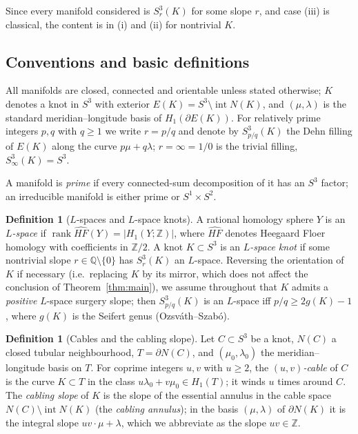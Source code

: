 \documentclass[11pt]{article}
\theoremstyle{definition}
\newtheorem{definition}[theorem]{Definition}
\theoremstyle{remark}
\DeclareMathOperator{\rank}{rank}
\newcommand{\HF}{\widehat{HF}}
\newcommand{\Z}{\mathbb{Z}}
\begin{document}
Since every manifold considered is $S^3_r(K)$ for some slope $r$, and case
(iii) is classical, the content is in (i) and (ii) for nontrivial $K$.

\subsection{Conventions and basic definitions}

All manifolds are closed, connected and orientable unless stated otherwise;
$K$ denotes a knot in $S^3$ with exterior $E(K)=S^{3}\setminus \operatorname{int}N(K)$,
and $(\mu,\lambda)$ is the standard meridian--longitude basis of
$H_1(\partial E(K))$.  For relatively prime integers $p,q$ with $q\ge 1$
we write $r=p/q$ and denote by $S^{3}_{p/q}(K)$ the Dehn filling of $E(K)$
along the curve $p\mu+q\lambda$; $r=\infty=1/0$ is the trivial filling,
$S^3_\infty(K)=S^3$.

A manifold is \emph{prime} if every connected-sum decomposition of it has an
$S^3$ factor; an irreducible manifold is either prime or $S^1\times S^2$.

\begin{definition}[$L$-spaces and $L$-space knots]
A rational homology sphere $Y$ is an \emph{$L$-space} if
$\rank \HF(Y)=|H_1(Y;\Z)|$, where $\HF$ denotes Heegaard Floer homology with
coefficients in $\Z/2$.  A knot $K\subset S^3$ is an \emph{$L$-space knot} if
some nontrivial slope $r\in\mathbb{Q}\setminus\{0\}$ has $S^3_r(K)$ an
$L$-space.  Reversing the orientation of $K$ if necessary (i.e.\ replacing $K$
by its mirror, which does not affect the conclusion of
Theorem~\ref{thm:main}), we assume throughout that $K$ admits a
\emph{positive} $L$-space surgery slope; then $S^3_{p/q}(K)$ is an $L$-space
iff $p/q\ge 2g(K)-1$, where $g(K)$ is the Seifert genus
(Ozsv\'ath--Szab\'o).
\end{definition}

\begin{definition}[Cables and the cabling slope]\label{def:cable}
Let $C\subset S^3$ be a knot, $N(C)$ a closed tubular neighbourhood,
$T=\partial N(C)$, and $(\mu_0,\lambda_0)$ the meridian--longitude basis on
$T$.  For coprime integers $u,v$ with $u\ge 2$, the \emph{$(u,v)$-cable} of
$C$ is the curve $K\subset T$ in the class $u\lambda_0+v\mu_0\in H_1(T)$; it
winds $u$ times around $C$.  The \emph{cabling slope} of $K$ is the slope of
the essential annulus in the cable space $N(C)\setminus\operatorname{int}N(K)$
(the \emph{cabling annulus}); in the basis $(\mu,\lambda)$ of $\partial N(K)$
it is the integral slope $uv\cdot\mu+\lambda$, which we abbreviate as the
slope $uv\in\Z$.
\end{definition}
\end{document}

